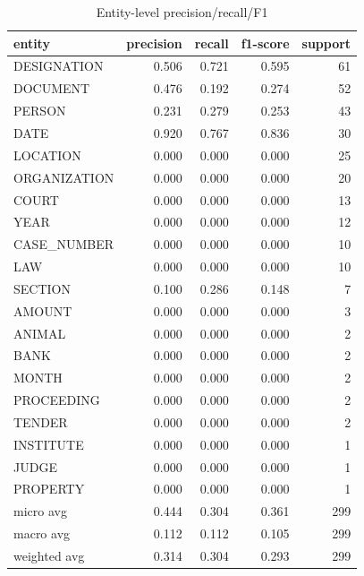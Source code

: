 \begin{table}
\caption{Entity-level precision/recall/F1}
\label{tab:ner_results}
\begin{tabular}{lrrrr}
\toprule
entity & precision & recall & f1-score & support \\
\midrule
DESIGNATION & 0.506 & 0.721 & 0.595 & 61 \\
DOCUMENT & 0.476 & 0.192 & 0.274 & 52 \\
PERSON & 0.231 & 0.279 & 0.253 & 43 \\
DATE & 0.920 & 0.767 & 0.836 & 30 \\
LOCATION & 0.000 & 0.000 & 0.000 & 25 \\
ORGANIZATION & 0.000 & 0.000 & 0.000 & 20 \\
COURT & 0.000 & 0.000 & 0.000 & 13 \\
YEAR & 0.000 & 0.000 & 0.000 & 12 \\
CASE\_NUMBER & 0.000 & 0.000 & 0.000 & 10 \\
LAW & 0.000 & 0.000 & 0.000 & 10 \\
SECTION & 0.100 & 0.286 & 0.148 & 7 \\
AMOUNT & 0.000 & 0.000 & 0.000 & 3 \\
ANIMAL & 0.000 & 0.000 & 0.000 & 2 \\
BANK & 0.000 & 0.000 & 0.000 & 2 \\
MONTH & 0.000 & 0.000 & 0.000 & 2 \\
PROCEEDING & 0.000 & 0.000 & 0.000 & 2 \\
TENDER & 0.000 & 0.000 & 0.000 & 2 \\
INSTITUTE & 0.000 & 0.000 & 0.000 & 1 \\
JUDGE & 0.000 & 0.000 & 0.000 & 1 \\
PROPERTY & 0.000 & 0.000 & 0.000 & 1 \\
micro avg & 0.444 & 0.304 & 0.361 & 299 \\
macro avg & 0.112 & 0.112 & 0.105 & 299 \\
weighted avg & 0.314 & 0.304 & 0.293 & 299 \\
\bottomrule
\end{tabular}
\end{table}
